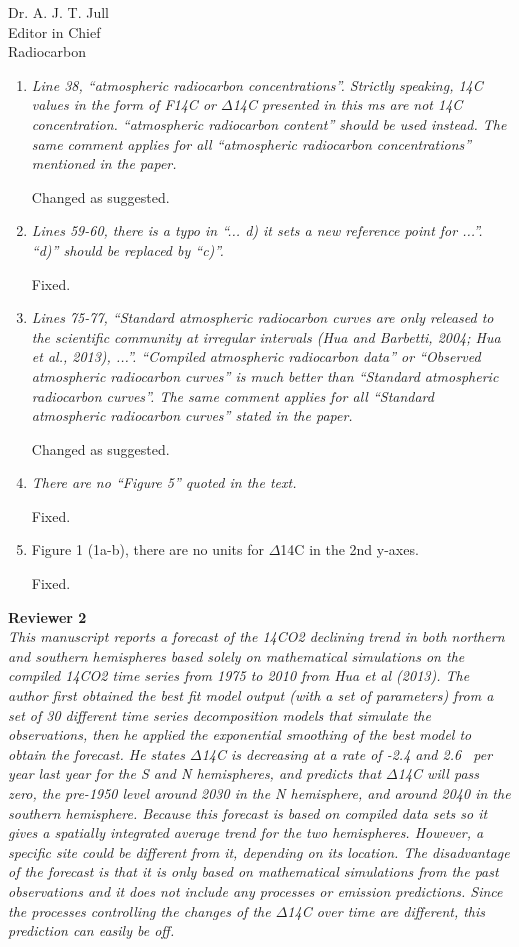 \documentclass[11pt]{bgcletter}
\begin{document}
\begin{letter}{Dr. A. J. T. Jull \\
 Editor in Chief \\ Radiocarbon}
\begin{enumerate}
\item {\it Line 38, ``atmospheric radiocarbon concentrations''. Strictly speaking, 14C values in the form of F14C or $\Delta$14C presented in this ms are not 14C concentration. ``atmospheric radiocarbon content'' should be used instead. The same comment applies for all ``atmospheric radiocarbon concentrations'' mentioned in the paper.}

{\color{blue} Changed as suggested.}

\item {\it Lines 59-60, there is a typo in ``... d) it sets a new reference point for ...''. ``d)''  should be replaced by ``c)''.}

{\color{blue} Fixed.}

\item {\it Lines 75-77, ``Standard atmospheric radiocarbon curves are only released to the scientific community at irregular intervals (Hua and Barbetti, 2004; Hua et al., 2013), ...''. ``Compiled atmospheric radiocarbon data'' or ``Observed atmospheric radiocarbon curves'' is much better than ``Standard atmospheric radiocarbon curves''. The same comment applies for all ``Standard atmospheric radiocarbon curves'' stated in the paper.}

{\color{blue} Changed as suggested.}

\item {\it There are no ``Figure 5'' quoted in the text.}

{\color{blue} Fixed.}

\item  Figure 1 (1a-b), there are no units for $\Delta$14C in the 2nd y-axes.

{\color{blue} Fixed.}

\end{enumerate}

{\bf Reviewer 2} \\
{\it This manuscript reports a forecast of the 14CO2 declining trend in both northern and southern hemispheres based solely on mathematical simulations on the compiled 14CO2 time series from 1975 to 2010 from Hua et al (2013).  The author first obtained the best fit model output (with a set of parameters) from a set of 30 different time series decomposition models that simulate the observations, then he applied the exponential smoothing of the best model to obtain the forecast.  He states $\Delta$14C is decreasing at a rate of -2.4 and 2.6 \textperthousand \ per year last year for the S and N hemispheres, and predicts that $\Delta$14C will pass zero, the pre-1950 level around 2030 in the N hemisphere, and around 2040 in the southern hemisphere. Because this forecast is based on compiled data sets so it gives a spatially integrated average trend for the two hemispheres.  However, a specific site could be different from it, depending on its location. The disadvantage of the forecast is that it is only based on mathematical simulations from the past observations and it does not include any processes or emission predictions.  Since the processes controlling the changes of the $\Delta$14C over time are different, this prediction can easily be off.  }


\end{letter}
\end{document}
